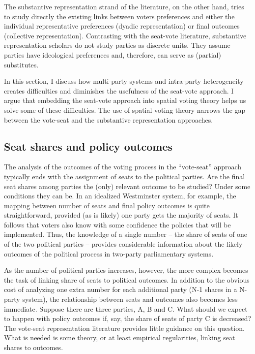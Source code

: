 The substantive representation strand of the literature, on the other hand, tries to study directly the existing links between voters preferences and either the individual representative preferences (dyadic representation) or final outcomes (collective representation). Contrasting with the seat-vote literature, substantive representation scholars do not study parties as discrete units. They assume parties have ideological preferences and, therefore, can serve as (partial) substitutes.  

In this section, I discuss how multi-party systems and intra-party heterogeneity creates difficulties and diminishes the usefulness of the seat-vote approach. I argue that embedding the seat-vote approach into spatial voting theory helps us solve some of these difficulties. The use of spatial voting theory narrows the gap between the vote-seat and the substantive representation approaches. 

\subsection*{Seat shares and policy outcomes}

The analysis of the outcomes of the voting process in the ``vote-seat'' approach typically ends with the assignment of seats to the political parties. Are the final seat shares among parties the (only) relevant outcome to be studied? Under some conditions they can be. In an idealized Westminster system, for example, the mapping between number of seats and final policy outcomes is quite straightforward, provided (as is likely)  one party gets the majority of seats. It follows that voters also know with some confidence the policies that will be implemented. Thus, the knowledge of a single number -- the share of seats of one of the two political parties -- provides considerable information about the likely outcomes of the political process in two-party parliamentary systems.  

As the number of political parties increases, however, the more complex becomes the task of linking share of seats to political outcomes. In addition to the obvious cost of analyzing one extra number for each additional party (N-1 shares in a N-party system), the  relationship between seats and outcomes also becomes less immediate. Suppose there are three parties, A, B and C. What should we expect to happen with policy outcomes if, say, the share of seats of party C is decreased? The vote-seat representation literature provides little guidance on this question. What is needed is  some theory, or at least  empirical regularities,  linking seat shares to outcomes. 

